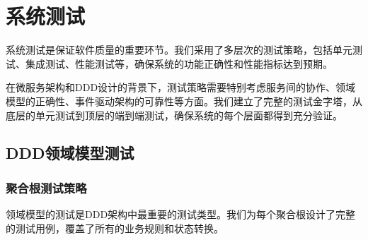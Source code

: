 \documentclass[a4paper,12pt]{article}
\begin{document}
\begin{center}
\end{center}

\section{系统测试}

系统测试是保证软件质量的重要环节。我们采用了多层次的测试策略，包括单元测试、集成测试、性能测试等，确保系统的功能正确性和性能指标达到预期。

在微服务架构和DDD设计的背景下，测试策略需要特别考虑服务间的协作、领域模型的正确性、事件驱动架构的可靠性等方面。我们建立了完整的测试金字塔，从底层的单元测试到顶层的端到端测试，确保系统的每个层面都得到充分验证。

\subsection{DDD领域模型测试}

\subsubsection{聚合根测试策略}

领域模型的测试是DDD架构中最重要的测试类型。我们为每个聚合根设计了完整的测试用例，覆盖了所有的业务规则和状态转换。
\end{document}
